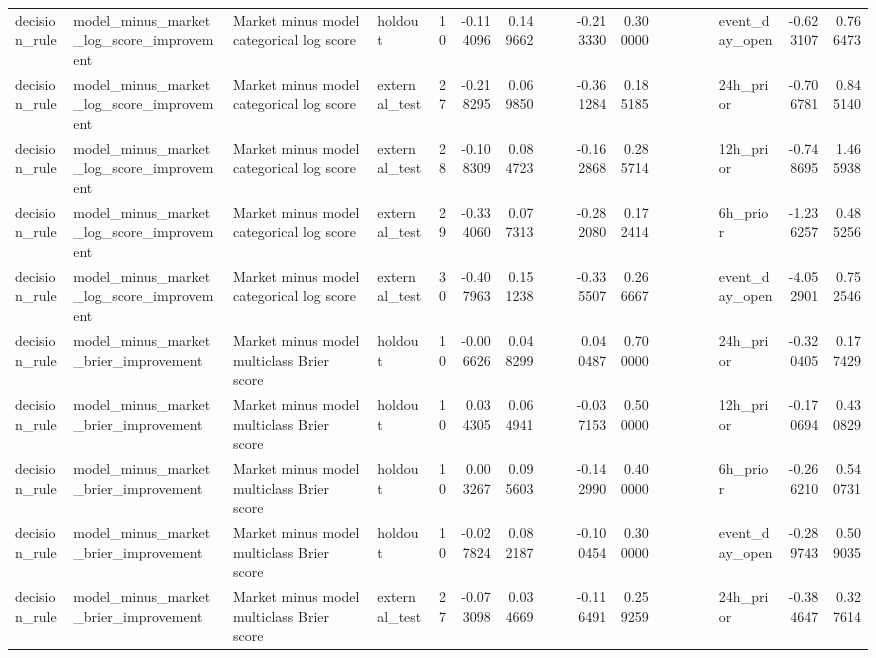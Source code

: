 \begin{tabular}{llllrrrrrrrlrrllrr}
decision\_rule & model\_minus\_market\_log\_score\_improvement & Market minus model categorical log score & holdout & 10 & -0.114096 & 0.149662 &  &  & -0.213330 & 0.300000 &  &  &  &  & event\_day\_open & -0.623107 & 0.766473 \\
decision\_rule & model\_minus\_market\_log\_score\_improvement & Market minus model categorical log score & external\_test & 27 & -0.218295 & 0.069850 &  &  & -0.361284 & 0.185185 &  &  &  &  & 24h\_prior & -0.706781 & 0.845140 \\
decision\_rule & model\_minus\_market\_log\_score\_improvement & Market minus model categorical log score & external\_test & 28 & -0.108309 & 0.084723 &  &  & -0.162868 & 0.285714 &  &  &  &  & 12h\_prior & -0.748695 & 1.465938 \\
decision\_rule & model\_minus\_market\_log\_score\_improvement & Market minus model categorical log score & external\_test & 29 & -0.334060 & 0.077313 &  &  & -0.282080 & 0.172414 &  &  &  &  & 6h\_prior & -1.236257 & 0.485256 \\
decision\_rule & model\_minus\_market\_log\_score\_improvement & Market minus model categorical log score & external\_test & 30 & -0.407963 & 0.151238 &  &  & -0.335507 & 0.266667 &  &  &  &  & event\_day\_open & -4.052901 & 0.752546 \\
decision\_rule & model\_minus\_market\_brier\_improvement & Market minus model multiclass Brier score & holdout & 10 & -0.006626 & 0.048299 &  &  & 0.040487 & 0.700000 &  &  &  &  & 24h\_prior & -0.320405 & 0.177429 \\
decision\_rule & model\_minus\_market\_brier\_improvement & Market minus model multiclass Brier score & holdout & 10 & 0.034305 & 0.064941 &  &  & -0.037153 & 0.500000 &  &  &  &  & 12h\_prior & -0.170694 & 0.430829 \\
decision\_rule & model\_minus\_market\_brier\_improvement & Market minus model multiclass Brier score & holdout & 10 & 0.003267 & 0.095603 &  &  & -0.142990 & 0.400000 &  &  &  &  & 6h\_prior & -0.266210 & 0.540731 \\
decision\_rule & model\_minus\_market\_brier\_improvement & Market minus model multiclass Brier score & holdout & 10 & -0.027824 & 0.082187 &  &  & -0.100454 & 0.300000 &  &  &  &  & event\_day\_open & -0.289743 & 0.509035 \\
decision\_rule & model\_minus\_market\_brier\_improvement & Market minus model multiclass Brier score & external\_test & 27 & -0.073098 & 0.034669 &  &  & -0.116491 & 0.259259 &  &  &  &  & 24h\_prior & -0.384647 & 0.327614 \\

\end{tabular}
